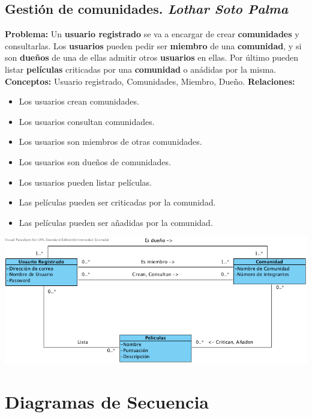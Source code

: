 \documentclass{article}
\begin{document}
	\subsection*{Gestión de comunidades. \textit{Lothar Soto Palma}}
	\textbf{Problema:} Un \textbf{usuario registrado} se va a encargar de crear \textbf{comunidades} y consultarlas. Los \textbf{usuarios} pueden pedir ser \textbf{miembro} de una \textbf{comunidad}, y si son \textbf{dueños} de una de ellas admitir otros \textbf{usuarios} en ellas. Por último pueden listar \textbf{películas} criticadas por una \textbf{comunidad} o anádidas por la misma.\\
	\textbf{Conceptos:} Usuario registrado, Comunidades, Miembro, Dueño.
	\textbf{Relaciones:}
		\begin{itemize}
			\item Los usuarios crean comunidades.
			\item Los usuarios consultan comunidades.
			\item Los usuarios son miembros de otras comunidades.
			\item Los usuarios son dueños de comunidades.
			\item Los usuarios pueden listar películas.
			\item Las películas pueden ser criticadas por la comunidad.
			\item Las películas pueden ser añadidas por la comunidad.
		\end{itemize}
		\includegraphics[width=1\linewidth]{./C-Comunidades}
		
\section{Diagramas de Secuencia}
\end{document}
